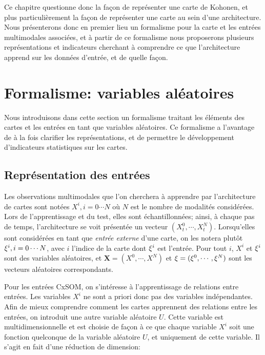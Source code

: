 Ce chapitre questionne donc la façon de représenter une carte de Kohonen, et plus particulièrement la façon de représenter une carte au sein d'une architecture. Nous présenterons donc en premier lieu un formalisme pour la carte et les entrées multimodales associées, et à partir de ce formalisme nous proposerons plusieurs représentations et indicateurs cherchant à comprendre ce que l'architecture apprend sur les données d'entrée, et de quelle façon. 

\section{Formalisme: variables aléatoires}

Nous introduisons dans cette section un formalisme traitant les éléments des cartes et les entrées en tant que variables aléatoires. Ce formalisme a l'avantage de à la fois clarifier les représentations, et de permettre le développement d'indicateurs statistiques sur les cartes.

\subsection{Représentation des entrées}

Les observations multimodales que l'on cherchera à apprendre par l'architecture de cartes sont notées ${X^i, i = 0 \cdots N}$ où $N$ est le nombre de modalités considérées. Lors de l'apprentissage et du test, elles sont échantillonnées; ainsi, à chaque pas de temps, l'architecture se voit présentée un vecteur $(X^0_t, \cdots, X^N_t)$.
Lorsqu'elles sont considérées en tant que \emph{entrée externe} d'une carte, on les notera plutôt ${\xi^i, i=0 \cdots N} $, avec $i$ l'indice de la carte dont $\xi^i$ est l'entrée.
Pour tout $i$, $X^i$ et $\xi^i$ sont des variables aléatoires, et $\mathbf{X} = (X^0, \cdots, X^N)$ et $\mathbf{\xi} = (\xi^0, \cdots , \xi^N)$ sont les vecteurs aléatoires correspondants.

Pour les entrées CxSOM, on s'intéresse à l'apprentissage de relations entre entrées. Les variables $X^i$ ne sont a priori donc pas des variables indépendantes. Afin de mieux comprendre comment les cartes apprennent des relations entre les entrées, on introduit une autre variable aléatoire $U$. Cette variable est multidimensionnelle et est choisie de façon à ce que chaque variable $X^i$ soit une fonction quelconque de la variable aléatoire $U$, et uniquement de cette variable. Il s'agit en fait d'une réduction de dimension:

